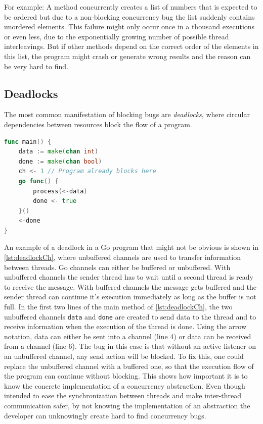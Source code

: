 \documentclass[conference]{IEEEtran}
\begin{document}
For example: A method concurrently creates a list of numbers that is expected to be ordered but due to a non-blocking concurrency bug the list suddenly contains unordered elements.
This failure might only occur once in a thousand executions or even less, due to the exponentially growing number of possible thread interleavings.
But if other methods depend on the correct order of the elements in this list, the program might crash or generate wrong results and the reason can be very hard to find.

\subsection{Deadlocks}

The most common manifestation of blocking bugs are \emph{deadlocks}, where circular dependencies between resources block the flow of a program.

\begin{lstlisting}[float=h, language=Go, label=lst:deadlockCh, caption={Deadlock caused by misuse of an \emph{unbuffered Channel}}]
func main() {
    data := make(chan int)
    done := make(chan bool)
    ch <- 1 // Program already blocks here
    go func() {
        process(<-data)
        done <- true
    }()
    <-done
}
\end{lstlisting}

An example of a deadlock in a Go program that might not be obvious is shown in \cref{lst:deadlockCh}, where unbuffered channels are used to transfer information between threads.
Go channels can either be buffered or unbuffered.
With unbuffered channels the sender thread has to wait until a second thread is ready to receive the message.
With buffered channels the message gets buffered and the sender thread can continue it's execution immediately as long as the buffer is not full.
In the first two lines of the main method of \cref{lst:deadlockCh}, the two unbuffered channels \lstinline{data} and \lstinline{done} are created to send data to the thread and to receive information when the execution of the thread is done.
Using the arrow notation, data can either be sent into a channel (line 4) or data can be received from a channel (line 6).
The bug in this case is that without an active listener on an unbuffered channel, any send action will be blocked.
To fix this, one could replace the unbuffered channel with a buffered one, so that the execution flow of the program can continue without blocking.
This shows how important it is to know the concrete implementation of a concurrency abstraction.
Even though intended to ease the synchronization between threads and make inter-thread communication safer, by not knowing the implementation of an abstraction the developer can unknowingly create hard to find concurrency bugs.
\end{document}
